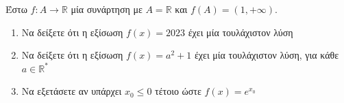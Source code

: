 \documentclass{presentation}
\begin{document}
\begin{askisi}
  Έστω $f:A\to\mathbb{R}$ μία συνάρτηση με $A=\mathbb{R}$ και $f(A)=(1,+\infty)$.
  \begin{enumerate}
    \item<1-> Να δείξετε ότι η εξίσωση $f(x)=2023$ έχει μία τουλάχιστον λύση
    \item<2-> Να δείξετε ότι η εξίσωση $f(x)=a^2+1$ έχει μία τουλάχιστον λύση, για κάθε $a\in\mathbb{R^*}$
    \item<3-> Να εξετάσετε αν υπάρχει $x_0\le 0$ τέτοιο ώστε $f(x)=e^{x_0}$
  \end{enumerate}
\end{askisi}

\moodle
\end{document}
